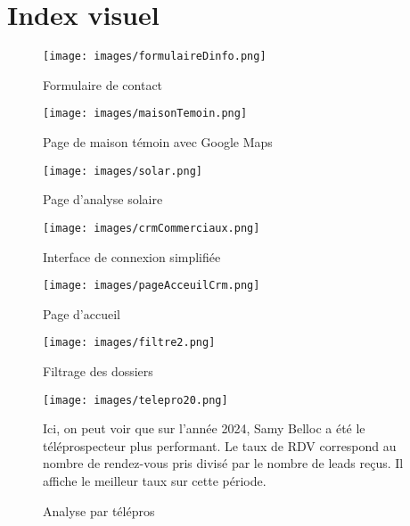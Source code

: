 \section*{Index visuel}

\begin{figure}[H]
    \centering
    \texttt{[image: images/formulaireDinfo.png]}
    \caption{Formulaire de contact}
\label{fig:formulaire-contact}
\end{figure}

\begin{figure}[H]
    \centering
    \texttt{[image: images/maisonTemoin.png]}
    \caption{Page de maison témoin avec Google Maps}
    \label{fig:maison-temoin}
\end{figure}

\begin{figure}[H]
    \centering
    \texttt{[image: images/solar.png]}
    \label{fig:analyse-solaire}
    \caption{Page d’analyse solaire}
\end{figure}

\newpage

\begin{figure}[H]
    \centering
    \texttt{[image: images/crmCommerciaux.png]}
    \caption{Interface de connexion simplifiée}
    \label{fig:connexion-crm}
\end{figure}

\begin{figure}[H]
    \centering
    \texttt{[image: images/pageAcceuilCrm.png]}
    \caption{Page d'accueil}
    \label{fig:page-accueil}
\end{figure}

\begin{figure}[H]
    \centering
    \texttt{[image: images/filtre2.png]}
    \caption{Filtrage des dossiers}
    \label{fig:filtrage}
\end{figure}

\newpage

\begin{figure}[H]
    \centering
    \texttt{[image: images/telepro20.png]}
    \caption{Analyse par télépros}

    \label{fig:analyse-telepros}
    \vspace{0.5em}
        {\small
        Ici, on peut voir que sur l’année 2024, Samy Belloc a été le téléprospecteur plus performant.
        Le taux de RDV correspond au nombre de rendez-vous pris divisé par le nombre de leads reçus.
        Il affiche le meilleur taux sur cette période.

        }
\end{figure}


